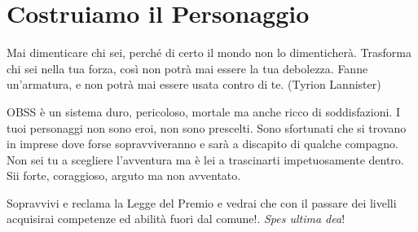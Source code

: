 \section{Costruiamo il Personaggio}

\begin{changemargin}{0.3cm}{0.3cm}\begin{enfasi}{
Mai dimenticare chi sei, perché di certo il mondo non lo dimenticherà. Trasforma chi sei nella tua forza, così non potrà mai essere la tua debolezza. Fanne un'armatura, e non potrà mai essere usata contro di te. (Tyrion Lannister)
}\end{enfasi}\end{changemargin}\medskip

OBSS è un sistema duro, pericoloso, mortale ma anche ricco di soddisfazioni. I tuoi personaggi non sono eroi, non sono prescelti. Sono sfortunati che si trovano in imprese dove forse sopravviveranno e sarà a discapito di qualche compagno. Non sei tu a scegliere l'avventura ma è lei a trascinarti impetuosamente dentro. Sii forte, coraggioso, arguto ma non avventato.

Sopravvivi e reclama la Legge del Premio e vedrai che con il passare dei livelli acquisirai competenze ed abilità fuori dal comune!. \emph{Spes ultima dea}!

